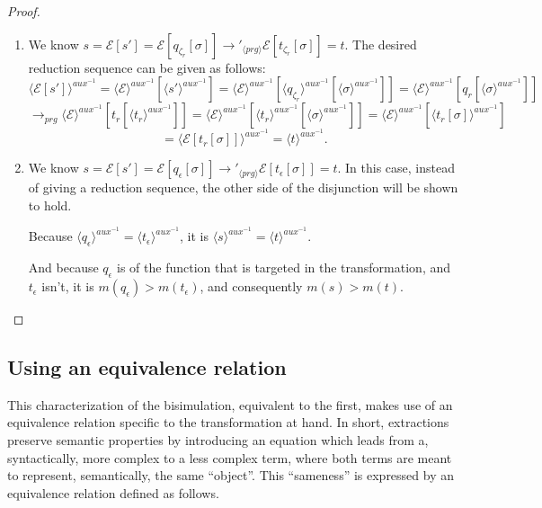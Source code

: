 \begin{proposition}
\begin{proof}
\begin{enumerate}
\item We know $s = \mathcal{E}[s'] = \mathcal{E}[q_{\zeta_r}[\sigma]] \longrightarrow'_{\langle prg \rangle} \mathcal{E}[t_{\zeta_r}[\sigma]] = t$. The desired reduction sequence can be given as follows:
\[
\langle \mathcal{E}[s'] \rangle^{aux^{-1}} = \langle \mathcal{E} \rangle^{aux^{-1}}[\langle s' \rangle^{aux^{-1}}] = \langle \mathcal{E} \rangle^{aux^{-1}}[\langle q_{\zeta_r} \rangle^{aux^{-1}}[\langle \sigma \rangle^{aux^{-1}}]] = \langle \mathcal{E} \rangle^{aux^{-1}}[q_r[\langle \sigma \rangle^{aux^{-1}}]]
\]
\[
\longrightarrow_{prg} \langle \mathcal{E} \rangle^{aux^{-1}}[t_r[\langle t_r \rangle^{aux^{-1}}]] = \langle \mathcal{E} \rangle^{aux^{-1}}[\langle t_r \rangle^{aux^{-1}}[\langle \sigma \rangle^{aux^{-1}}]] = \langle \mathcal{E} \rangle^{aux^{-1}}[\langle t_r[\sigma] \rangle^{aux^{-1}}]
\]
\[
= \langle \mathcal{E}[t_r[\sigma]] \rangle^{aux^{-1}} = \langle t \rangle^{aux^{-1}}.
\]

\item We know $s = \mathcal{E}[s'] = \mathcal{E}[q_\epsilon[\sigma]] \longrightarrow'_{\langle prg \rangle} \mathcal{E}[t_\epsilon[\sigma]] = t$. In this case, instead of giving a reduction sequence, the other side of the disjunction will be shown to hold.

Because $\langle q_\epsilon \rangle^{aux^{-1}} = \langle t_\epsilon \rangle^{aux^{-1}}$, it is $\langle s \rangle^{aux^{-1}} = \langle t \rangle^{aux^{-1}}$.

And because $q_\epsilon$ is of the function that is targeted in the transformation, and $t_\epsilon$ isn't, it is $m(q_\epsilon) > m(t_\epsilon)$, and consequently $m(s) > m(t)$.
\end{enumerate}
\end{proof}
\end{proposition}

\subsection{Using an equivalence relation}

This characterization of the bisimulation, equivalent to the first, makes use of an equivalence relation specific to the transformation at hand. In short, extractions preserve semantic properties by introducing an equation which leads from a, syntactically, more complex to a less complex term, where both terms are meant to represent, semantically, the same ``object''. This ``sameness'' is expressed by an equivalence relation defined as follows.

